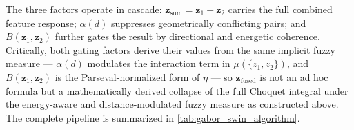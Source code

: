 \documentclass[preprint,12pt]{elsarticle}
\begin{document}
The three factors operate in cascade: $\mathbf{z}_{\text{sum}} = \mathbf{z}_1+\mathbf{z}_2$ carries the full combined feature response; $\alpha(d)$ suppresses geometrically conflicting pairs; and $B(\mathbf{z}_1,\mathbf{z}_2)$ further gates the result by directional and energetic coherence. Critically, both gating factors derive their values from the same implicit fuzzy measure — $\alpha(d)$ modulates the interaction term in $\mu(\{z_1,z_2\})$, and $B(\mathbf{z}_1,\mathbf{z}_2)$ is the Parseval-normalized form of $\eta$ — so $\mathbf{z}_{\text{fused}}$ is not an ad hoc formula but a mathematically derived collapse of the full Choquet integral under the energy-aware and distance-modulated fuzzy measure as constructed above. The complete pipeline is summarized in \autoref{tab:gabor_swin_algorithm}.
\end{document}
